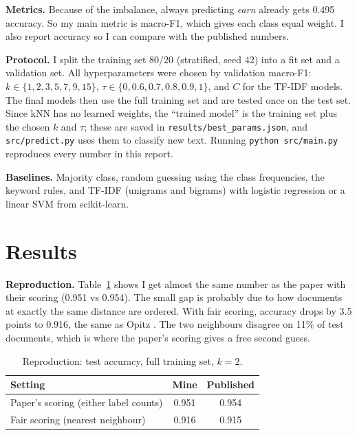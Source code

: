 \documentclass{COMPXXXX}
\begin{document}
\textbf{Metrics.} Because of the imbalance, always predicting \emph{earn} already gets 0.495 accuracy. So my main metric is macro-F1, which gives each class equal weight. I also report accuracy so I can compare with the published numbers.

\textbf{Protocol.} I split the training set 80/20 (stratified, seed 42) into a fit set and a validation set. All hyperparameters were chosen by validation macro-F1: $k \in \{1,2,3,5,7,9,15\}$, $\tau \in \{0,0.6,0.7,0.8,0.9,1\}$, and $C$ for the TF-IDF models. The final models then use the full training set and are tested once on the test set. Since kNN has no learned weights, the ``trained model'' is the training set plus the chosen $k$ and $\tau$; these are saved in \texttt{results/best\_params.json}, and \texttt{src/predict.py} uses them to classify new text. Running \texttt{python src/main.py} reproduces every number in this report.

\textbf{Baselines.} Majority class, random guessing using the class frequencies, the keyword rules, and TF-IDF (unigrams and bigrams) with logistic regression or a linear SVM from scikit-learn.

\section{Results}
\textbf{Reproduction.} Table~\ref{tab:repro} shows I get almost the same number as the paper with their scoring (0.951 vs 0.954). The small gap is probably due to how documents at exactly the same distance are ordered. With fair scoring, accuracy drops by 3.5 points to 0.916, the same as Opitz \cite{opitz2023}. The two neighbours disagree on 11\% of test documents, which is where the paper's scoring gives a free second guess.

\begin{table}
\centering
\caption{Reproduction: test accuracy, full training set, $k{=}2$.}
\label{tab:repro}
\begin{tabular}{@{}lcc@{}}
\toprule
Setting & Mine & Published \\
\midrule
Paper's scoring (either label counts) & 0.951 & 0.954 \cite{jiang2023} \\
Fair scoring (nearest neighbour) & 0.916 & 0.915 \cite{opitz2023} \\
\bottomrule
\end{tabular}
\end{table}
\end{document}
